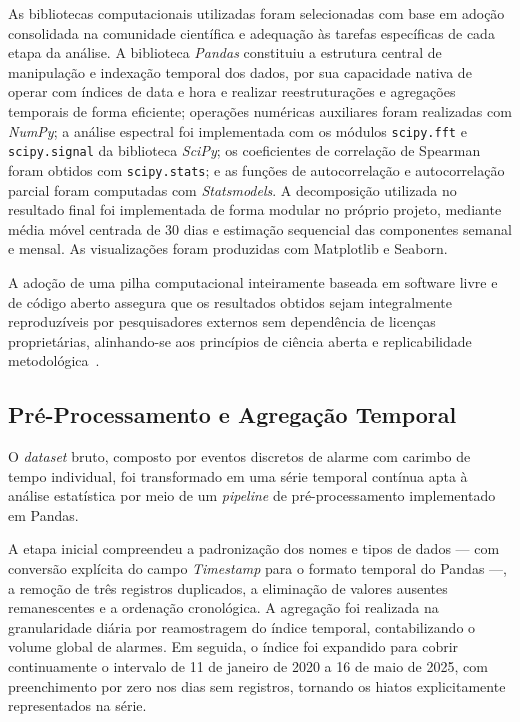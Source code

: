 As bibliotecas computacionais utilizadas foram selecionadas com base em adoção consolidada na comunidade científica e adequação às tarefas específicas de cada etapa da análise. A biblioteca \textit{Pandas} constituiu a estrutura central de manipulação e indexação temporal dos dados, por sua capacidade nativa de operar com índices de data e hora e realizar reestruturações e agregações temporais de forma eficiente; operações numéricas auxiliares foram realizadas com \textit{NumPy}; a análise espectral foi implementada com os módulos \texttt{scipy.fft} e \texttt{scipy.signal} da biblioteca \textit{SciPy}; os coeficientes de correlação de Spearman foram obtidos com \texttt{scipy.stats}; e as funções de autocorrelação e autocorrelação parcial foram computadas com \textit{Statsmodels}. A decomposição utilizada no resultado final foi implementada de forma modular no próprio projeto, mediante média móvel centrada de 30 dias e estimação sequencial das componentes semanal e mensal. As visualizações foram produzidas com Matplotlib e Seaborn.

A adoção de uma pilha computacional inteiramente baseada em software livre e de código aberto assegura que os resultados obtidos sejam integralmente reproduzíveis por pesquisadores externos sem dependência de licenças proprietárias, alinhando-se aos princípios de ciência aberta e replicabilidade metodológica~\cite{araujo2025cienciaaberta}.

\subsection{Pré-Processamento e Agregação Temporal}

O \textit{dataset} bruto, composto por eventos discretos de alarme com carimbo de tempo individual, foi transformado em uma série temporal contínua apta à análise estatística por meio de um \textit{pipeline} de pré-processamento implementado em Pandas.

A etapa inicial compreendeu a padronização dos nomes e tipos de dados --- com conversão explícita do campo \textit{Timestamp} para o formato temporal do Pandas ---, a remoção de três registros duplicados, a eliminação de valores ausentes remanescentes e a ordenação cronológica. A agregação foi realizada na granularidade diária por reamostragem do índice temporal, contabilizando o volume global de alarmes. Em seguida, o índice foi expandido para cobrir continuamente o intervalo de 11 de janeiro de 2020 a 16 de maio de 2025, com preenchimento por zero nos dias sem registros, tornando os hiatos explicitamente representados na série.

